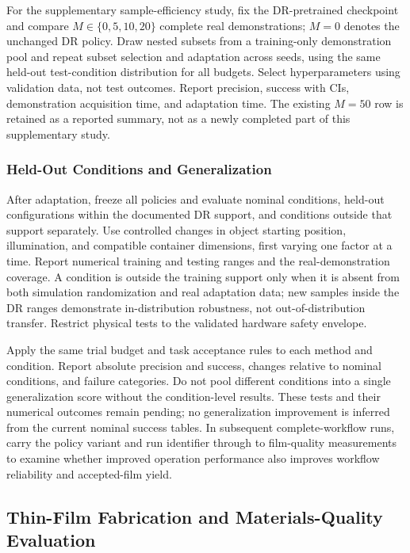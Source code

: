 For the supplementary sample-efficiency study, fix the DR-pretrained checkpoint and compare $M\in\{0,5,10,20\}$ complete real demonstrations; $M=0$ denotes the unchanged DR policy. Draw nested subsets from a training-only demonstration pool and repeat subset selection and adaptation across seeds, using the same held-out test-condition distribution for all budgets. Select hyperparameters using validation data, not test outcomes. Report precision, success with CIs, demonstration acquisition time, and adaptation time. The existing $M=50$ row is retained as a reported summary, not as a newly completed part of this supplementary study.

\subsubsection{Held-Out Conditions and Generalization}
\label{subsec:transfer_generalization}
After adaptation, freeze all policies and evaluate nominal conditions, held-out configurations within the documented DR support, and conditions outside that support separately. Use controlled changes in object starting position, illumination, and compatible container dimensions, first varying one factor at a time. Report numerical training and testing ranges and the real-demonstration coverage. A condition is outside the training support only when it is absent from both simulation randomization and real adaptation data; new samples inside the DR ranges demonstrate in-distribution robustness, not out-of-distribution transfer. Restrict physical tests to the validated hardware safety envelope.

Apply the same trial budget and task acceptance rules to each method and condition. Report absolute precision and success, changes relative to nominal conditions, and failure categories. Do not pool different conditions into a single generalization score without the condition-level results. These tests and their numerical outcomes remain pending; no generalization improvement is inferred from the current nominal success tables. In subsequent complete-workflow runs, carry the policy variant and run identifier through to film-quality measurements to examine whether improved operation performance also improves workflow reliability and accepted-film yield.

\subsection{Thin-Film Fabrication and Materials-Quality Evaluation}
\label{subsec:exp_dipcoat_quality}

